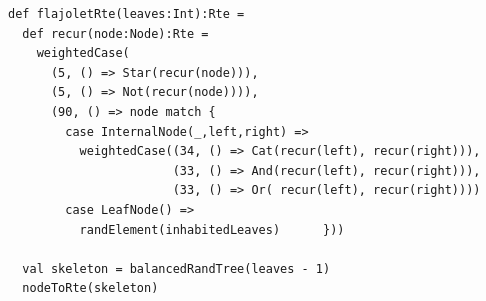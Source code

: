 \begin{lstlisting}[style=scalaioScala]
def flajoletRte(leaves:Int):Rte =
  def recur(node:Node):Rte =
    weightedCase(
      (5, () => Star(recur(node))),
      (5, () => Not(recur(node)))),
      (90, () => node match {
        case InternalNode(_,left,right) =>
          weightedCase((34, () => Cat(recur(left), recur(right))),
                       (33, () => And(recur(left), recur(right))),
                       (33, () => Or( recur(left), recur(right))))
        case LeafNode() =>
          randElement(inhabitedLeaves)      }))

  val skeleton = balancedRandTree(leaves - 1)
  nodeToRte(skeleton)
\end{lstlisting}
